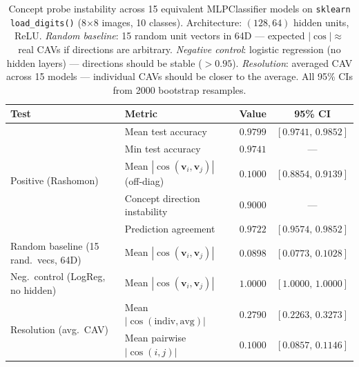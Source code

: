 \begin{table}[t]
\centering
\caption{Concept probe instability across 15 equivalent MLPClassifier models on
\texttt{sklearn} \texttt{load\_digits()} (8$\times$8 images, 10 classes).
Architecture: $(128, 64)$ hidden units, ReLU.
\emph{Random baseline}: 15 random unit vectors in 64D --- expected $|\cos| \approx$ real CAVs if directions are arbitrary.
\emph{Negative control}: logistic regression (no hidden layers) --- directions should be stable ($>0.95$).
\emph{Resolution}: averaged CAV across 15 models --- individual CAVs should be closer to the average.
All 95\% CIs from 2000 bootstrap resamples.}
\label{tab:concept_probe}
\begin{tabular}{llcc}
\toprule
\textbf{Test} & \textbf{Metric} & \textbf{Value} & \textbf{95\% CI} \\
\midrule
\multirow{5}{*}{Positive (Rashomon)} & Mean test accuracy & $0.9799$ & $[0.9741,\,0.9852]$ \\
& Min test accuracy & $0.9741$ & --- \\
& Mean $|\cos(\mathbf{v}_i,\mathbf{v}_j)|$ (off-diag) & $0.1000$ & $[0.8854,\,0.9139]$ \\
& Concept direction instability & $0.9000$ & --- \\
& Prediction agreement & $0.9722$ & $[0.9574,\,0.9852]$ \\
\midrule
Random baseline (15 rand.\ vecs, 64D) & Mean $|\cos(\mathbf{v}_i,\mathbf{v}_j)|$ & $0.0898$ & $[0.0773,\,0.1028]$ \\
\midrule
Neg.\ control (LogReg, no hidden) & Mean $|\cos(\mathbf{v}_i,\mathbf{v}_j)|$ & $1.0000$ & $[1.0000,\,1.0000]$ \\
\midrule
\multirow{2}{*}{Resolution (avg.\ CAV)} & Mean $|\cos(\text{indiv},\text{avg})|$ & $0.2790$ & $[0.2263,\,0.3273]$ \\
& Mean pairwise $|\cos(i,j)|$ & $0.1000$ & $[0.0857,\,0.1146]$ \\
\bottomrule
\end{tabular}
\end{table}
